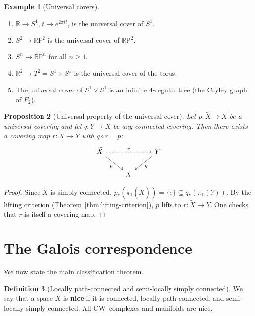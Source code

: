 \documentclass[12pt,a4paper,openany]{book}
\theoremstyle{definition}
\newtheorem{definition}{Definition}[chapter]
\newtheorem{example}[definition]{Example}
\theoremstyle{plain}
\newtheorem{proposition}[definition]{Proposition}
\theoremstyle{remark}
\newcommand{\R}{\mathbb{R}}
\newcommand{\RP}{\mathbb{R}\mathrm{P}}
\begin{document}
\begin{example}[Universal covers]\label{ex:universal-covers}
  \begin{enumerate}[label=(\roman*)]
    \item $\R \to S^1$, $t \mapsto e^{2\pi i t}$, is the universal cover
      of $S^1$.
    \item $S^2 \to \RP^2$ is the universal cover of $\RP^2$.
    \item $S^n \to \RP^n$ for all $n \geq 1$.
    \item $\R^2 \to T^2 = S^1 \times S^1$ is the universal cover of the torus.
    \item The universal cover of $S^1 \vee S^1$ is an infinite $4$-regular
      tree (the Cayley graph of $F_2$).
  \end{enumerate}
\end{example}

\begin{proposition}[Universal property of the universal cover]\label{prop:universal-cover-universal}
  Let $p\colon \widetilde{X} \to X$ be a universal covering and let
  $q\colon Y \to X$ be any connected covering.  Then there exists a covering
  map $r\colon \widetilde{X} \to Y$ with $q \circ r = p$:
  \[
    \begin{tikzcd}
      \widetilde{X} \ar[dr,"p"'] \ar[rr,dashed,"r"] & & Y \ar[dl,"q"] \\
      & X &
    \end{tikzcd}
  \]
\end{proposition}

\begin{proof}
  Since $\widetilde{X}$ is simply connected,
  $p_*(\pi_1(\widetilde{X})) = \{e\} \subseteq q_*(\pi_1(Y))$.  By
  the lifting criterion (Theorem~\ref{thm:lifting-criterion}), $p$ lifts to
  $r\colon \widetilde{X} \to Y$.  One checks that $r$ is itself a covering map.
\end{proof}

\section{The Galois correspondence}\label{sec:galois-correspondence}

We now state the main classification theorem.

\begin{definition}[Locally path-connected and semi-locally simply connected]\label{def:nice-space}
  We say that a space $X$ is \textbf{nice} if it is connected, locally
  path-connected, and semi-locally simply connected.  All CW~complexes and
  manifolds are nice.
\end{definition}
\end{document}
